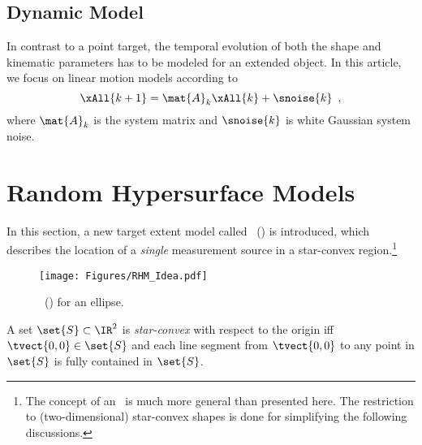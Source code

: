 \documentclass[preprint,1p,11pt]{ISAS_IR}
\begin{document}
\section{Dynamic Model}
In contrast to a point target, the temporal evolution of both the shape and kinematic parameters has to be modeled for an extended object.
 In this article,  we focus on  linear motion models according to
 \begin{equation} \label{eqn:dyn_eqn}
 \xAll{k+1}= \mat{A}_k  \xAll{k}+\snoise{k} \enspace, 
\end{equation}
where $\mat{A}_k$ is the system matrix  and $\snoise{k}$ is white Gaussian  system noise. \chapter{Random Hypersurface Models}
 \label{sec:rhm}
In this section, a new target extent model called \RHM\ (\rhm) is introduced, which describes the location of a \emph{single}  measurement source in a  star-convex region.\footnote{The concept of an \rhm\ is much more general than presented here. The restriction to (two-dimensional) star-convex shapes is done for simplifying the following discussions.}



\begin{figure}
\center 
\texttt{[image: Figures/RHM\_Idea.pdf]}
\caption{\RHM\ (\rhm) for an ellipse\label{fig:rhm}.}
\end{figure}
\begin{Definition}
 A set $\set{S}\subset \IR^2$ is \emph{star-convex} with respect to the origin iff $\tvect{0,0}\in \set{S}$ and  each line segment   from $\tvect{0,0}$ to any point in  $\set{S}$ is fully contained in $\set{S}$.
\end{Definition}
\end{document}
